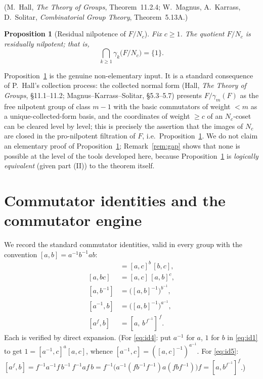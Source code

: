 \documentclass{amsart}
\newtheorem{proposition}{Proposition}
\theoremstyle{definition}
\theoremstyle{remark}
\begin{document}
\noindent
(M.\ Hall, \emph{The Theory of Groups}, Theorem~11.2.4; W.\ Magnus, A.\ Karrass,
D.\ Solitar, \emph{Combinatorial Group Theory}, Theorem~5.13A.)

\begin{proposition}[Residual nilpotence of $F/N_c$]\label{prop:RN}
Fix $c\ge1$. The quotient $F/N_c$ is residually nilpotent; that is,
\[
\bigcap_{k\ge1}\gamma_k\!\big(F/N_c\big)=\{1\}.
\]
\end{proposition}

\noindent
Proposition~\ref{prop:RN} is the genuine non-elementary input. It is a standard
consequence of P.\ Hall's collection process: the collected normal form
(Hall, \emph{The Theory of Groups}, \S11.1--11.2; Magnus--Karrass--Solitar,
\S5.3--5.7) presents $F/\gamma_m(F)$ as the free nilpotent group of class $m-1$
with the basic commutators of weight $<m$ as a unique-collected-form basis, and
the coordinates of weight $\ge c$ of an $N_c$-coset can be cleared level by level;
this is precisely the assertion that the images of $N_c$ are closed in the
pro-nilpotent filtration of $F$, i.e.\ Proposition~\ref{prop:RN}. We do not claim
an elementary proof of Proposition~\ref{prop:RN}; Remark~\ref{rem:gap} shows that
none is possible at the level of the tools developed here, because
Proposition~\ref{prop:RN} is \emph{logically equivalent} (given part (II)) to the
theorem itself.

\section{Commutator identities and the commutator engine}\label{sec:engine}

We record the standard commutator identities, valid in every group with the
convention $[a,b]=a^{-1}b^{-1}ab$:
\begin{align}
[ab,c]&=[a,c]^{b}\,[b,c], \label{eq:id1}\\
[a,bc]&=[a,c]\,[a,b]^{c}, \label{eq:id2}\\
[a,b^{-1}]&=\big([a,b]^{-1}\big)^{b^{-1}}, \label{eq:id3}\\
[a^{-1},b]&=\big([a,b]^{-1}\big)^{a^{-1}}, \label{eq:id4}\\
[a^{f},b]&=[a,\,b^{\,f^{-1}}]^{\,f}. \label{eq:id5}
\end{align}
Each is verified by direct expansion. (For \eqref{eq:id4}: put $a^{-1}$ for $a$,
$1$ for $b$ in \eqref{eq:id1} to get $1=[a^{-1},c]^{a}[a,c]$, whence
$[a^{-1},c]=([a,c]^{-1})^{a^{-1}}$. For \eqref{eq:id5}:
$[a^f,b]=f^{-1}a^{-1}f\,b^{-1}\,f^{-1}af\,b
=f^{-1}\big(a^{-1}(fb^{-1}f^{-1})a(fbf^{-1})\big)f=[a,b^{f^{-1}}]^{f}$.)
\end{document}
